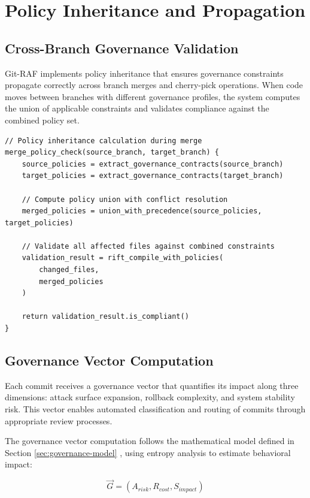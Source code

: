 \section{Policy Inheritance and Propagation}

\subsection{Cross-Branch Governance Validation}

Git-RAF implements policy inheritance that ensures governance constraints propagate correctly across branch merges and cherry-pick operations. When code moves between branches with different governance profiles, the system computes the union of applicable constraints and validates compliance against the combined policy set.

\begin{lstlisting}[style=riftlang, language=rift]
// Policy inheritance calculation during merge
merge_policy_check(source_branch, target_branch) {
    source_policies = extract_governance_contracts(source_branch)
    target_policies = extract_governance_contracts(target_branch)
    
    // Compute policy union with conflict resolution
    merged_policies = union_with_precedence(source_policies, target_policies)
    
    // Validate all affected files against combined constraints
    validation_result = rift_compile_with_policies(
        changed_files, 
        merged_policies
    )
    
    return validation_result.is_compliant()
}
\end{lstlisting}

\subsection{Governance Vector Computation}

Each commit receives a governance vector that quantifies its impact along three dimensions: attack surface expansion, rollback complexity, and system stability risk. This vector enables automated classification and routing of commits through appropriate review processes.

The governance vector computation follows the mathematical model defined in Section \ref{sec:governance-model} \cite{TODO:governance-vector-spec}, using entropy analysis to estimate behavioral impact:

\begin{equation}
\vec{G} = (A_{risk}, R_{cost}, S_{impact})
\end{equation}

